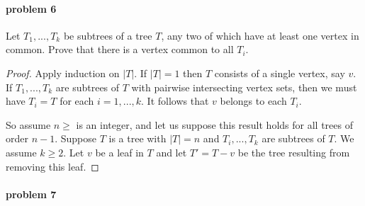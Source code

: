 \paragraph{problem 6}
Let $ T_1,...,T_k $ be subtrees of a tree $ T $, any two of which have at least 
one vertex in common. Prove that there is a vertex common to all $ T_i$.
\begin{proof}
   Apply induction on $|T|$. If $|T| = 1$ then $T$ consists of a single vertex,
   say $ v$. If $ T_1,...,T_k $ are subtrees of $ T $ with pairwise intersecting
   vertex sets, then we must have $T_i = T$ for each $ i = 1,...,k$. It follows 
   that $ v $ belongs to each $ T_i$.
   
   \smallskip \noindent
   So assume $ n \geq $ is an integer, and let us suppose this result holds for 
   all trees of order $ n - 1 $. Suppose $ T $ is a tree with $ |T| = n $ and 
   $ T_i,...,T_k $ are subtrees of $ T $. We assume $ k \geq 2 $. Let $ v $ be a 
   leaf in $ T $ and let $ T' = T - v $ be the tree resulting from removing
   this leaf. 
\end{proof}

\paragraph{problem 7}
